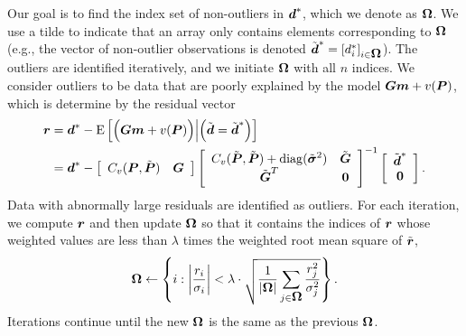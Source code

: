 \documentclass[extra,mreferee]{gji}
\begin{document}
Our goal is to find the index set of non-outliers in $\mitbf{d}^*$, which we denote as $\mitbf{\Omega}$. We use a tilde to indicate that an array only contains elements corresponding to $\mitbf{\Omega}$ (e.g., the vector of non-outlier observations is denoted $\tilde{\mitbf{d}}^* = [d_i^*]_{i \in \mitbf{\Omega}}$). The outliers are identified iteratively, and we initiate $\mitbf{\Omega}$ with all $n$ indices. We consider outliers to be data that are poorly explained by the model $\mitbf{G}\mitbf{m} + v(\mitbf{P})$, which is determine by the residual vector 
\begin{align}\label{eq:Residual}
\mitbf{r} &= \mitbf{d}^* - \mathrm{E}\left[\Big(\mitbf{G}\mitbf{m} + v(\mitbf{P})\Big) \Big| \Big(\tilde{\mitbf{d}} = \tilde{\mitbf{d}}^*\Big)\right] \\
          &= \mitbf{d}^*  - 
            \left[\begin{array}{cc}
                  C_v(\mitbf{P},\tilde{\mitbf{P}}) & \mitbf{G} \nonumber \\
                  \end{array}\right]
            \left[\begin{array}{cc}
                  C_v(\tilde{\mitbf{P}},\tilde{\mitbf{P}}) + \mathrm{diag}(\tilde{\mitbf{\sigma}}^2) & \tilde{\mitbf{G}} \\
                  \tilde{\mitbf{G}}^T  & \mitbf{0} \\
                  \end{array}\right]^{-1}
            \left[\begin{array}{c}
                  \tilde{\mitbf{d}}^* \\
                  \mitbf{0} \\
                  \end{array}\right].
\end{align}
Data with abnormally large residuals are identified as outliers. For each iteration, we compute $\mitbf{r}$ and then update $\mitbf{\Omega}$ so that it contains the indices of $\mitbf{r}$ whose weighted values are less than $\lambda$ times the weighted root mean square of $\tilde{\mitbf{r}}$, 
\begin{equation}\label{eq:Update}
\mitbf{\Omega} \leftarrow \left\{i : \left|\frac{r_i}{\sigma_i}\right| < \lambda \cdot \sqrt{\frac{1}{|\mitbf{\Omega}|} \sum_{j \in \mitbf{\Omega}} \frac{r_j^2}{\sigma_j^2}} \right\}.
\end{equation} 
Iterations continue until the new $\mitbf{\Omega}$ is the same as the previous $\mitbf{\Omega}$. 
\end{document}
